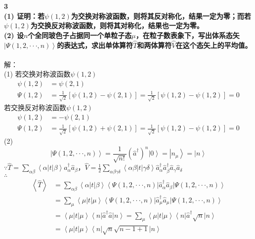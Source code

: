 \documentclass[12pt]{article}
\numberwithin{equation}{section}	 %
\begin{document}
\begin{spacing}{1.5}
\textbf{3 \quad \\
(1) 证明：若$\psi(1,2)$为交换对称波函数，则将其反对称化，结果一定为零；而若$\psi(1,2)$为交换反对称波函数，则将其对称化，结果也一定为零。\\
(2) 设$n$个全同玻色子占据同一个单粒子态$\mu$，在粒子数表象下，写出体系态矢$\left|\Psi(1,2,\cdot\cdot\cdot,n)\right>$的表达式，求出单体算符$\hat{T}$和两体算符$\hat{V}$在这个态矢上的平均值。
}\\
~\\
解：\\
(1) 若交换对称波函数$\psi(1,2)$
\begin{align*}
\psi(1,2) &= \psi(2,1) \\
\Psi(1,2) &= \frac{1}{\sqrt{2}}\left[\psi(1,2) - \psi(2,1)\right] = \frac{1}{\sqrt{2}}\left[\psi(1,2) - \psi(1,2)\right] = 0
\end{align*}
若交换反对称波函数$\psi(1,2)$
\begin{align*}
\psi(1,2) &= -\psi(2,1) \\
\Psi(1,2) &= \frac{1}{\sqrt{2}}\left[\psi(1,2) + \psi(2,1)\right] = \frac{1}{\sqrt{2}}\left[\psi(1,2) - \psi(1,2)\right] = 0
\end{align*}
(2) 
\begin{equation}
\left|\Psi(1,2,\cdot\cdot\cdot,n)\right> = \frac{1}{\sqrt{n!}}(\hat{a}^{\dag})^{n}\left|0\right> = \left|n_{\mu}\right> = \left|n\right>
\end{equation}
$\because \displaystyle \hat{T}=\sum_{\alpha\beta}\left<\alpha\left|t\right|\beta\right>\hat{a}^{\dag}_{\alpha}\hat{a}_{\beta}$，$\displaystyle \hat{V}=\frac{1}{2}\sum_{\alpha\beta\gamma\delta} \left<\alpha\beta\left|t\right|\gamma\delta\right>\hat{a}^{\dag}_{\alpha}\hat{a}_{\beta}^{\dag}\hat{a}_{\gamma}\hat{a}_{\delta}$ \\
$\therefore$
\begin{align*}
\left<\hat{T}\right> &= \sum_{\alpha\beta}\left<\alpha\left|t\right|\beta\right>\left<\Psi(1,2,\cdot\cdot\cdot,n)\right| \hat{a}^{\dag}_{\alpha}\hat{a}_{\beta} \left|\Psi(1,2,\cdot\cdot\cdot,n)\right> \\
&= \sum_{\mu}\left<\mu\left|t\right|\mu\right>\left<\Psi(1,2,\cdot\cdot\cdot,n)\right| \hat{a}^{\dag}_{\mu}\hat{a}_{\mu} \left|\Psi(1,2,\cdot\cdot\cdot,n)\right> \\
&= \left<\mu\left|t\right|\mu\right>\left<n\right| \hat{a}^{\dag}\hat{a} \left|n\right> = \sum_{\mu}\left<\mu\left|t\right|\mu\right>\left<n\right| \hat{a}^{\dag} \sqrt{n}\left|n\right> \\
&= \left<\mu\left|t\right|\mu\right>\left<n\right| \sqrt{n}\sqrt{n-1+1} \left|n\right> \\

\end{align*}
\end{spacing}
\end{document}
